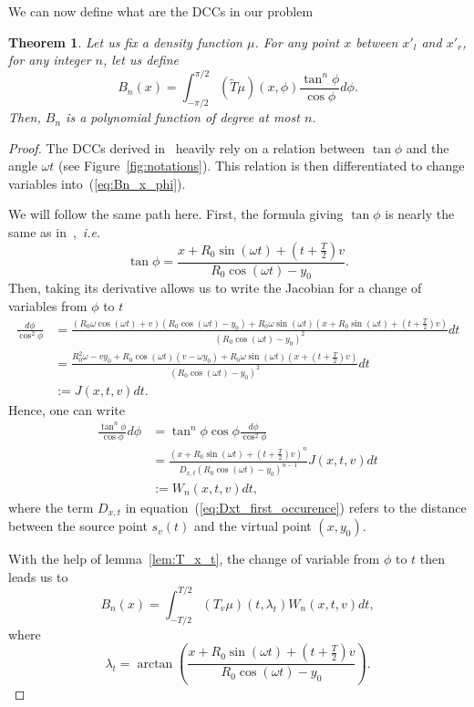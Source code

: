 \documentclass[a4paper]{article}
\numberwithin{equation}{section}
\newtheorem{theorem}{Theorem}
\begin{document}
We can now define what are the DCCs in our problem
\begin{theorem}
Let us fix a density function $\mu$. For any point $x$ between $x'_l$ and $x'_r$, for any integer $n$, let us define
\begin{equation}
	B_n(x) = \int_{-\pi/2}^{\pi/2} \left( \tilde{T}\mu	\right)(x,\phi) \frac{\tan^n \phi}{\cos \phi} d\phi.	
	\label{eq:Bn_x_phi}
\end{equation}
Then, $B_n$ is a polynomial function of degree at most $n$.
\end{theorem}
\begin{proof}
The DCCs derived in~\cite{clackdoyle2015consistency} heavily rely on a relation between $\tan \phi$ and the angle $\omega t$ (see Figure~\ref{fig:notations}). This relation is then differentiated to change variables into~(\ref{eq:Bn_x_phi}).

We will follow the same path here. First, the formula giving $\tan \phi$ is nearly the same as in~\cite{clackdoyle2015consistency},~\emph{i.e.}
$$
\tan \phi = \frac{x + R_0 \sin(\omega t) + \left( t + \frac{T}{2} \right)v}{R_0 \cos(\omega t) - y_0}.
$$
Then, taking its derivative allows us to write the Jacobian for a change of variables from $\phi$ to $t$
\begin{align*}
\frac{d\phi}{\cos^2 \phi} &= \frac{ \left( R_0 \omega \cos(\omega t) +v \right) \left( R_0 \cos(\omega t) - y_0 \right) + R_0 \omega \sin(\omega t) \left( x + R_0 \sin(\omega t) + \left( t + \frac{T}{2} \right)v \right) }{ \left( R_0 \cos(\omega t) - y_0 \right)^2 } dt \\
 &= \frac{ R_0^2 \omega - v y_0 + R_0 \cos(\omega t)(v-\omega y_0) + R_0 \omega \sin(\omega t)(x + \left( t + \frac{T}{2} \right)v ) }{ \left( R_0 \cos(\omega t) - y_0 \right)^2 } dt\\
 &:= J(x,t,v) dt.
\end{align*}
Hence, one can write
\begin{align}
	\frac{\tan^n \phi}{\cos \phi} d\phi &= \tan^n \phi \cos \phi \frac{d\phi}{\cos^2 \phi} \\
	&= \frac{ \left( x+R_0 \sin(\omega t) + \left( t + \frac{T}{2} \right)v \right)^n }{D_{x,t} \left( R_0 \cos(\omega t) - y_0 \right)^{n-1}} J(x,t,v) dt \label{eq:Dxt_first_occurence} \\
	&:= W_n(x,t,v) dt,
\end{align}
where the term $D_{x,t}$ in equation~(\ref{eq:Dxt_first_occurence}) refers to the distance between the source point $s_v(t)$ and the virtual point $(x,y_0)$.

With the help of lemma~\ref{lem:T_x_t}, the change of variable from $\phi$ to $t$ then leads us to
\begin{equation}
	B_n(x) = \int_{-T/2}^{T/2} \left( T_v \mu \right)(t,\lambda_t) W_n(x,t,v) dt,
	\label{eq:Bnx_DCC}
\end{equation}
where
\begin{equation}
	\lambda_t = \arctan \left( \frac{x + R_0 \sin(\omega t) + \left( t + \frac{T}{2} \right)v}{R_0 \cos(\omega t) - y_0} \right).
\end{equation}
\end{proof}
\end{document}
